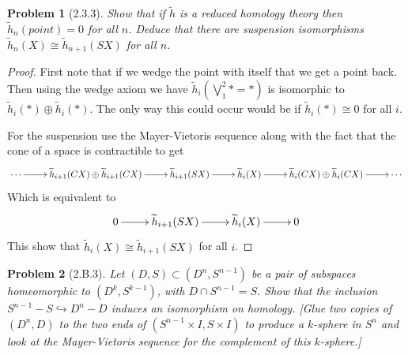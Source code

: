 \documentclass[10pt]{article}
\newcommand{\sk}{\vskip 10mm}
\newcommand{\rh}{\widetilde{h}}
\theoremstyle{plain}
\newtheorem{problem}{Problem}
\theoremstyle{remark}
\begin{document}
\sk

\begin{problem}[2.3.3]
  Show that if $\rh$ is a reduced homology theory then $\rh_n(point)=0$ for all
  $n$. Deduce that there are suspension isomorphisms $\rh_n(X)\cong\rh_{n+1}(SX)$
  for all $n$.
\end{problem}

\begin{proof}
  First note that if we wedge the point with itself that we get a point back.
  Then using the wedge axiom we have $\rh_i(\bigvee_1^2*=*)$ is isomorphic to
  $\rh_i(*)\oplus\rh_i(*)$. The only way this could occur would be if $\rh_i(*)\cong 0$
  for all $i$.

  For the suspension use the Mayer-Vietoris sequence along with the
  fact that the cone of a space is contractible to get
  \[
    \xymatrix{
      \cdots \ar[r] & \rh_{i+1}(CX)\oplus \rh_{i+1}(CX) \ar[r] & \rh_{i+1}(SX) \ar[r] & \rh_i(X) \ar[r] & \rh_i(CX)\oplus \rh_i(CX) \ar[r] & \cdots
    }
  \]
  Which is equivalent to
  \[
    \xymatrix{
      0 \ar[r] & \rh_{i+1}(SX) \ar[r] & \rh_i(X) \ar[r] & 0
      }
  \]
  This show that $\rh_i(X)\cong\rh_{i+1}(SX)$ for all $i$.
\end{proof}

\sk

\begin{problem}[2.B.3]
  Let $(D,S)\subset (D^n,S^{n-1})$ be a pair of subspaces homeomorphic to
  $(D^k,S^{k-1})$, with $D\cap S^{n-1}=S$. Show that the inclusion
  $S^{n-1}-S\hookrightarrow D^n-D$ induces an isomorphism on homology. [Glue two
  copies of $(D^n,D)$ to the two ends of $(S^{n-1}\times I,S\times I)$ to
  produce a $k$-sphere in $S^n$ and look at the Mayer-Vietoris sequence for the
  complement of this $k$-sphere.]
\end{problem}
\end{document}
